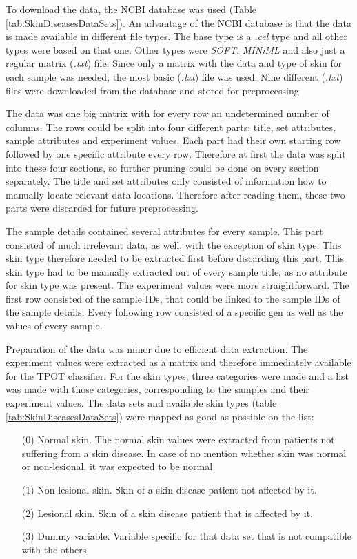 \documentclass[10pt,a4paper]{article}
\begin{document}
	To download the data, the NCBI database was used (Table \ref{tab:SkinDiseasesDataSets}).  An advantage of the NCBI database is that the data is made available in different file types. The base type is a  \textit{.cel} type and all other types were based on that one. Other types were \textit{SOFT}, \textit{MINiML} and also just a regular matrix (\textit{.txt}) file. Since only a matrix with the data and type of skin for each sample was needed, the most basic (\textit{.txt}) file was used. Nine different (\textit{.txt}) files were downloaded from the database and stored for preprocessing
	
	The data was one big matrix with for every row an undetermined number of columns. The rows could be split into four different parts: title, set attributes, sample attributes and experiment values. Each part had their own starting row followed by one specific attribute every row. Therefore at first the data was split into these four sections, so further pruning could be done on every section separately. The title and set attributes only consisted of information how to manually locate relevant data locations. Therefore after reading them, these two parts were discarded for future preprocessing.
	
	The sample details contained several attributes for every sample. This part consisted of much irrelevant data, as well, with the exception of skin type. This skin type therefore needed to be extracted first before discarding this part. This skin type had to be manually extracted out of every sample title, as no attribute for skin type was present. The experiment values were more straightforward. The first row consisted of the sample IDs, that could be linked to the sample IDs of the sample details. Every following row consisted of a specific gen as well as the values of every sample.
	
	Preparation of the data was minor due to efficient data extraction. The experiment values were extracted as a matrix and therefore immediately available for the TPOT classifier. For the skin types, three categories were made and a list was made with those categories, corresponding to the samples and their experiment values. The data sets and available skin types (table \ref{tab:SkinDiseasesDataSets}) were mapped as good as possible on the list: 
	
	\begin{enumerate}
		\item[(0)] Normal skin. The normal skin values were extracted from patients not suffering from a skin disease. In case of no mention whether skin was normal or non-lesional, it was expected to be normal
		\item[(1)] Non-lesional skin. Skin of a skin disease patient not affected by it.
		\item[(2)] Lesional skin. Skin of a skin disease patient that is affected by it.
		\item[(3)] Dummy variable. Variable specific for that data set that is not compatible with the others
	\end{enumerate}
\end{document}
